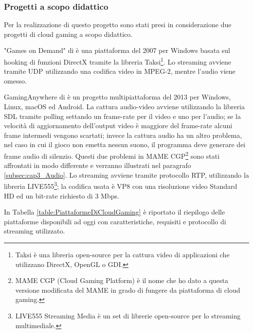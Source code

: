 \subsubsection{Progetti a scopo didattico}
Per la realizzazione di questo progetto sono stati presi in considerazione due progetti di cloud gaming a scopo didattico.

"Games on Demand" di \parencite{ARealTimeStreamingGamesonDemandSystem} è una piattaforma del 2007 per Windows basata sul hooking di funzioni DirectX tramite la libreria Taksi\footnote{Taksi è una libreria open-source per la cattura video di applicazioni che utilizzano DirectX, OpenGL o GDI.}. Lo streaming avviene tramite UDP utilizzando una codifica video in MPEG-2, mentre l'audio viene omesso.

GamingAnywhere di \parencite{GamingAnywhere} è un progetto multipiattaforma del 2013 per Windows, Linux, macOS ed Android. La cattura audio-video avviene utilizzando la libreria SDL tramite polling settando un frame-rate per il video e uno per l'audio; se la velocità di aggiornamento dell'output video è maggiore del frame-rate alcuni frame intermedi vengono scartati; invece la cattura audio ha un altro problema, nel caso in cui il gioco non emetta nessun suono, il programma deve generare dei frame audio di silenzio. Questi due problemi in MAME CGP\footnote{MAME CGP (Cloud Gaming Platform) è il nome che ho dato a questa versione modificata del MAME in grado di fungere da piattaforma di cloud gaming.} sono stati affrontati in modo differente e verranno illustrati nel paragrafo \ref{subsec:cap3_Audio}. Lo streaming avviene tramite protocollo RTP, utilizzando la libreria LIVE555\footnote{LIVE555 Streaming Media è un set di librerie open-source per lo streaming multimediale.}; la codifica usata è VP8 con una risoluzione video Standard HD ed un bit-rate richiesto di 3 Mbps.

In Tabella \ref{table:PiattaformeDiCloudGaming} è riportato il riepilogo delle piattaforme disponibili ad oggi con caratteristiche, requisiti e protocollo di streaming utilizzato.

